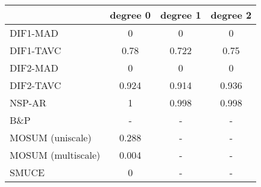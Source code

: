 \begin{tabular}{|l|c|c|c|}
  \hline
 & degree 0 & degree 1 & degree 2 \\ 
  \hline
DIF1-MAD & 0 & 0 & 0 \\ 
  DIF1-TAVC & 0.78 & 0.722 & 0.75 \\ 
  DIF2-MAD & 0 & 0 & 0 \\ 
  DIF2-TAVC & 0.924 & 0.914 & 0.936 \\ 
  NSP-AR & 1 & 0.998 & 0.998 \\ 
  B\&P & - & - & - \\ 
  MOSUM (uniscale) & 0.288 & - & - \\ 
  MOSUM (multiscale) & 0.004 & - & - \\ 
  SMUCE & 0 & - & - \\ 
   \hline
\end{tabular}
